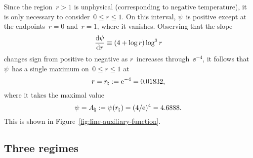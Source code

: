 Since the region~$r > 1$ is unphysical
(corresponding to negative temperature),
it is only necessary to consider~$0 \le r \le 1$.
On this interval, $\psi$~is positive
except at the endpoints~$r = 0$ and~$r = 1$, where it vanishes.
Observing that the slope
\begin{equation}
  \tder{\psi}{r} \ideq (4 + \log r) \log^3 r
  \label{eq:line-psi-r-derivative}
\end{equation}
changes sign from positive to negative
as $r$~increases through~$\ee^{-4}$,
it follows that $\psi$~has a single maximum on~$0 \le r \le 1$ at
\begin{equation}
  r = r_\natural := \mathrm{e}^{-4} = 0.01832,
  \label{eq:line-r-natural}
\end{equation}
where it takes the maximal value
\begin{equation}
  \psi
  = A_\natural
  := \psi (r_\natural)
  = (4 / \mathrm{e})^4
  = 4.6888.
  \label{eq:line-a-natural}
\end{equation}
This is shown in Figure~\ref{fig:line-auxiliary-function}.

\subsection{Three regimes}
\label{sec:polar.viable.regimes}

\begin{figure}
\end{figure}

